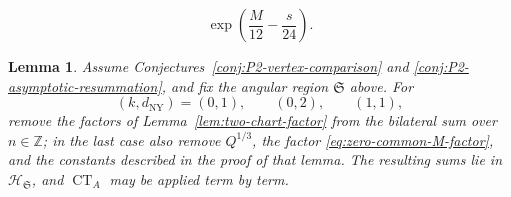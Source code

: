 \documentclass[10pt,a4paper]{amsart}
\newtheorem{lemma}{Lemma}
\newcommand{\Z}{\mathbb Z}
\begin{document}
\begin{equation}
 \exp\left(\frac{M}{12}-\frac{s}{24}\right).
\label{eq:zero-common-M-factor}
\end{equation}

\begin{lemma}
\label{lem:bilateral-u-zero-limit}
Assume Conjectures~\ref{conj:P2-vertex-comparison} and \ref{conj:P2-asymptotic-resummation}, and fix the angular region \(\mathfrak S\) above.  For
\[
 (k,d_{\mathrm{NY}})=(0,1),\qquad (0,2),\qquad (1,1),
\]
remove the factors of Lemma~\ref{lem:two-chart-factor} from the bilateral sum over \(n\in\Z\); in the last case also remove \(Q^{1/3}\), the factor \eqref{eq:zero-common-M-factor}, and the constants described in the proof of that lemma.  The resulting sums lie in \(\mathscr H_{\mathfrak S}\), and \(\operatorname{CT}_A\) may be applied term by term.
\end{lemma}
\end{document}
